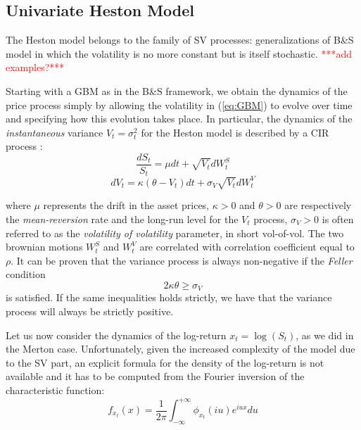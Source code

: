 \subsection{Univariate Heston Model}
The Heston model belongs to the family of SV processes: generalizations of B\&S model in which the volatility is no more constant but is itself  stochastic.
\textcolor{red}{***add examples?***}

Starting with a GBM as in the B\&S framework, we obtain the dynamics of the price process simply by allowing the volatility in (\ref{eq:GBM}) to evolve over time and specifying how this evolution takes place.
In particular, the dynamics of the \textit{instantaneous} variance $V_t = \sigma_t^2$ for the Heston model is described by a CIR process :
\begin{equation}
\label{eq:heston_price}
	\frac{dS_t}{S_t} = \mu dt +\sqrt{ V_t} dW_t^S
\end{equation}
\begin{equation}
\label{eq:heston_variance}
	dV_t = \kappa (\theta - V_t) dt + \sigma_V \sqrt{V_t} dW_t^V
\end{equation}

where $\mu$ represents the drift in the asset prices, $\kappa>0$ and $\theta>0$ are respectively the \textit{mean-reversion} rate  and the long-run level for the $V_t$ process, $\sigma_V>0$ is often referred to as the \textit{volatility of volatility} parameter, in short vol-of-vol.
The two brownian motions $W_t^S$ and $W_t^V$ are correlated with correlation coefficient equal to $\rho$.
It can be proven that the variance process is always non-negative if the \textit{Feller} condition
 \begin{equation}
 \label{eq:feller_condition}
	2\kappa\theta \geq \sigma_V
 \end{equation} 
 is satisfied. If the same inequalities holds strictly, we have that the variance process will always be strictly positive.

Let us now consider the dynamics of the log-return $x_t = \log (S_t)$, as we did in the Merton case. 
Unfortunately, given the increased complexity of the model due to the SV part, an explicit formula for the density of the log-return is not available and it has to be computed from the Fourier inversion of the characteristic function:
\begin{equation}
\label{eq:chf_inversion}
f_{x_t}(x) = \frac{1}{2\pi}\int_{-\infty}^{+\infty} \phi_{x_t}(i u) e^{i u x} du
\end{equation}

